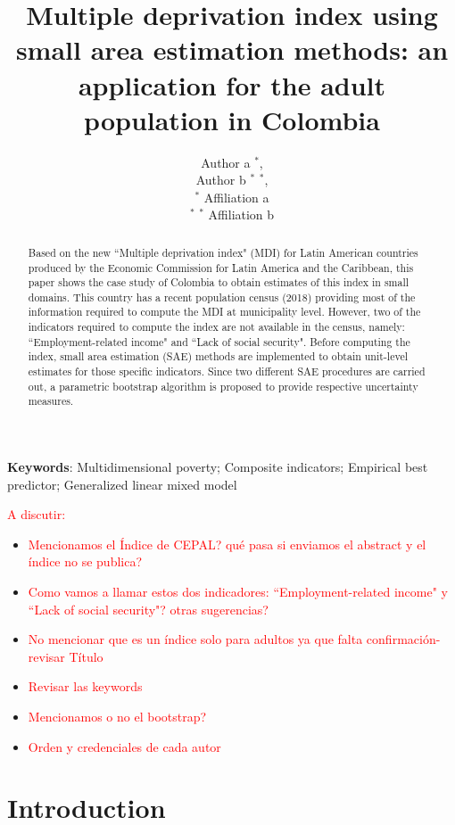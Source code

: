\documentclass[a4paper, 11pt]{article}
\title{Multiple deprivation index using small area estimation methods: an application for the adult population in Colombia}
\author
{Author a $^{\ast}$, \\ 
Author b $^{\ast}$ $^\ast$, 
\\
\normalsize{$^\ast$ Affiliation a}\\
\normalsize{$^\ast$ $^\ast$ Affiliation b}
}
\date{}
\begin{document}
\maketitle


\begin{abstract}\small

Based on the new ``Multiple deprivation index" (MDI) for Latin American countries produced by the Economic Commission for Latin America and the Caribbean, this paper shows the case study of Colombia to obtain estimates of this index in small domains. This country has a recent population census (2018) providing most of the information required to compute the MDI at municipality level. However,  two of the indicators required to compute the index are not available in the census, namely: ``Employment-related income" and ``Lack of social security". Before computing the index, small area estimation (SAE) methods are implemented to obtain unit-level estimates for those specific indicators. Since two different SAE procedures are carried out, a parametric bootstrap algorithm is proposed to provide respective uncertainty measures.  


\end{abstract}

{{\bf \noindent Keywords}: Multidimensional poverty; Composite indicators; Empirical best predictor; Generalized linear mixed model}	

\textcolor{red}{A discutir:}
\begin{itemize}
\item \textcolor{red}{Mencionamos el Índice de CEPAL? qué pasa si enviamos el abstract y el índice no se publica?}
\item \textcolor{red}{Como vamos a llamar estos dos indicadores: ``Employment-related income" y ``Lack of social security"? otras sugerencias?}
\item \textcolor{red}{No mencionar que es un índice solo para adultos ya que falta confirmación- revisar Título}
\item \textcolor{red}{Revisar las keywords}
\item \textcolor{red}{Mencionamos o no el bootstrap?}
\item \textcolor{red}{Orden y credenciales de cada autor}
\end{itemize}

\clearpage

\section{Introduction}
\end{document}
